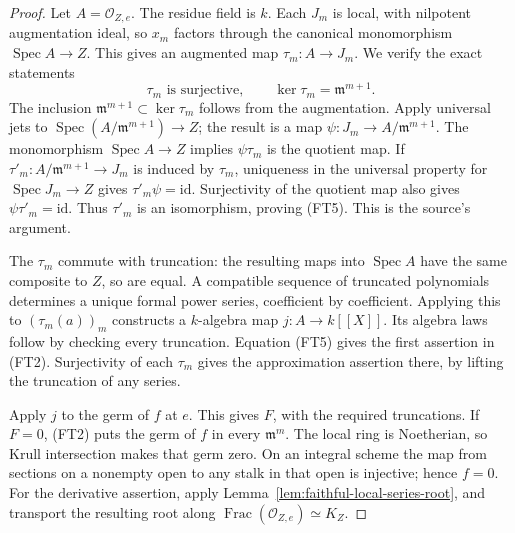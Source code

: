 \begin{proof}
Let \(A=\mathcal O_{Z,e}\).
The residue field is \(k\).
Each \(J_m\) is local, with nilpotent augmentation ideal,
so \(x_m\) factors through the canonical monomorphism
\(\operatorname{Spec}A\to Z\).
This gives an augmented map \(\tau_m:A\to J_m\).
We verify the exact statements
\[
          \tau_m\text{ is surjective},\qquad
                         \ker\tau_m=\mathfrak m^{m+1}.
 \tag{FT5}\label{eq:faithful-stalk-jet-quotient}
\]
The inclusion \(\mathfrak m^{m+1}\subset\ker\tau_m\)
follows from the augmentation.
Apply universal jets to
\(\operatorname{Spec}(A/\mathfrak m^{m+1})\to Z\);
the result is a map
\(\psi:J_m\to A/\mathfrak m^{m+1}\).
The monomorphism \(\operatorname{Spec}A\to Z\) implies
\(\psi\tau_m\) is the quotient map.
If \(\tau'_m:A/\mathfrak m^{m+1}\to J_m\) is induced
by \(\tau_m\), uniqueness in the universal property for
\(\operatorname{Spec}J_m\to Z\) gives
\(\tau'_m\psi=\mathrm{id}\).
Surjectivity of the quotient map also gives
\(\psi\tau'_m=\mathrm{id}\).
Thus \(\tau'_m\) is an isomorphism, proving (FT5).
This is the source's  argument.

The \(\tau_m\) commute with truncation: the resulting
maps into \(\operatorname{Spec}A\) have the same composite
to \(Z\), so are equal.
A compatible sequence of truncated polynomials determines
a unique formal power series, coefficient by coefficient.
Applying this to \((\tau_m(a))_m\) constructs a
\(k\)-algebra map \(j:A\to k[[X]]\).
Its algebra laws follow by checking every truncation.
Equation (FT5) gives the first assertion in (FT2).
Surjectivity of each \(\tau_m\) gives the approximation
assertion there, by lifting the truncation of any series.

Apply \(j\) to the germ of \(f\) at \(e\).
This gives \(F\), with the required truncations.
If \(F=0\), (FT2) puts the germ of \(f\) in every
\(\mathfrak m^m\).
The local ring is Noetherian, so Krull intersection
makes that germ zero.
On an integral scheme the map from sections on a
nonempty open to any stalk in that open is injective;
hence \(f=0\).
For the derivative assertion, apply
Lemma~\ref{lem:faithful-local-series-root}, and transport
the resulting root along
\(\operatorname{Frac}(\mathcal O_{Z,e})\simeq K_Z\).
\end{proof}

